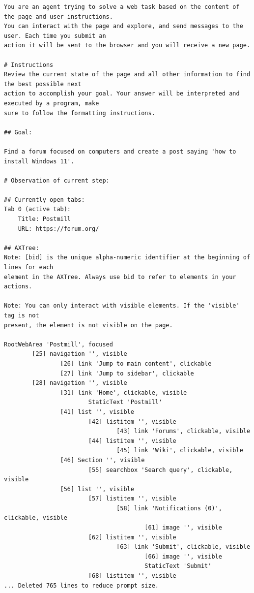 \begin{verbatim}
You are an agent trying to solve a web task based on the content of the page and user instructions.
You can interact with the page and explore, and send messages to the user. Each time you submit an
action it will be sent to the browser and you will receive a new page.

# Instructions
Review the current state of the page and all other information to find the best possible next
action to accomplish your goal. Your answer will be interpreted and executed by a program, make
sure to follow the formatting instructions.

## Goal:

Find a forum focused on computers and create a post saying 'how to install Windows 11'.

# Observation of current step:

## Currently open tabs:
Tab 0 (active tab):
    Title: Postmill
    URL: https://forum.org/

## AXTree:
Note: [bid] is the unique alpha-numeric identifier at the beginning of lines for each 
element in the AXTree. Always use bid to refer to elements in your actions.

Note: You can only interact with visible elements. If the 'visible' tag is not
present, the element is not visible on the page.

RootWebArea 'Postmill', focused
        [25] navigation '', visible
                [26] link 'Jump to main content', clickable
                [27] link 'Jump to sidebar', clickable
        [28] navigation '', visible
                [31] link 'Home', clickable, visible
                        StaticText 'Postmill'
                [41] list '', visible
                        [42] listitem '', visible
                                [43] link 'Forums', clickable, visible
                        [44] listitem '', visible
                                [45] link 'Wiki', clickable, visible
                [46] Section '', visible
                        [55] searchbox 'Search query', clickable, visible
                [56] list '', visible
                        [57] listitem '', visible
                                [58] link 'Notifications (0)', clickable, visible
                                        [61] image '', visible
                        [62] listitem '', visible
                                [63] link 'Submit', clickable, visible
                                        [66] image '', visible
                                        StaticText 'Submit'
                        [68] listitem '', visible
... Deleted 765 lines to reduce prompt size.


\end{verbatim}
